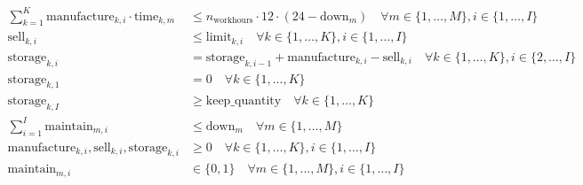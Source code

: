 \documentclass{article}
\begin{document}
\begin{align*}
\sum_{k=1}^{K} \text{manufacture}_{k,i} \cdot \text{time}_{k,m} & \leq n_{\text{workhours}} \cdot 12 \cdot (24 - \text{down}_m) \quad \forall m \in \{1, \ldots, M\}, i \in \{1, \ldots, I\} \\
\text{sell}_{k,i} & \leq \text{limit}_{k,i} \quad \forall k \in \{1, \ldots, K\}, i \in \{1, \ldots, I\} \\
\text{storage}_{k,i} & = \text{storage}_{k,i-1} + \text{manufacture}_{k,i} - \text{sell}_{k,i} \quad \forall k \in \{1, \ldots, K\}, i \in \{2, \ldots, I\} \\
\text{storage}_{k,1} & = 0 \quad \forall k \in \{1, \ldots, K\} \\
\text{storage}_{k,I} & \geq \text{keep\_quantity} \quad \forall k \in \{1, \ldots, K\} \\
\sum_{i=1}^{I} \text{maintain}_{m,i} & \leq \text{down}_m \quad \forall m \in \{1, \ldots, M\} \\
\text{manufacture}_{k,i}, \text{sell}_{k,i}, \text{storage}_{k,i} & \geq 0 \quad \forall k \in \{1, \ldots, K\}, i \in \{1, \ldots, I\} \\
\text{maintain}_{m,i} & \in \{0, 1\} \quad \forall m \in \{1, \ldots, M\}, i \in \{1, \ldots, I\}
\end{align*}
\end{document}
